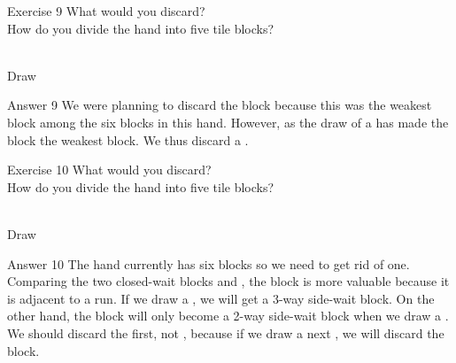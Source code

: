 \vfill

\begin{itembox}[l]{Exercise 9}
What would you discard? \\
\vsp
How do you divide the hand into five tile blocks? 

\bp
{}\bai\bai~\\
\hspace{290pt}\footnotesize{Draw}
\ep
\end{itembox}

\newpage

\begin{itembox}[r]{Answer 9}
\emj
We were planning to discard the {\large{}} block because this was the weakest block among the six blocks in this hand. However, as the draw of a {\large{}} has made the {\large{}} block the weakest block. We thus discard a {\large{}}.
\end{itembox}

\vfill

\begin{itembox}[l]{Exercise 10}
What would you discard? \\
\vsp
How do you divide the hand into five tile blocks? 

\bp
{}\bei\bei~\\
\hspace{290pt}\footnotesize{Draw}
\ep
\end{itembox}

\newpage


\begin{itembox}[r]{Answer 10}
\emj
The hand currently has six blocks so we need to get rid of one. Comparing the two closed-wait blocks {\large{}} and {\large{}}, the {\large{}} block is more valuable because it is adjacent to a run. If we draw a {\large{}}, we will get a 3-way side-wait block. On the other hand, the {\large{}} block will only become a 2-way side-wait block when we draw a {\large{}}. We should discard the {\large{}} first, not {\large{}}, because if we draw a {\large{}} next , we will discard the {\large{}} block.
\end{itembox}

